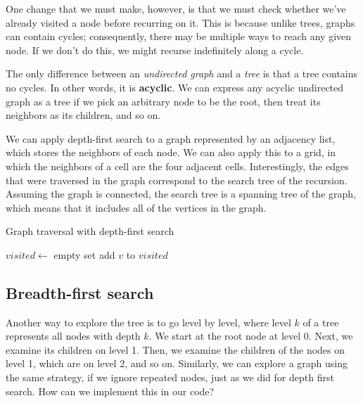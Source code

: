 One change that we must make, however, is that we must check whether we've already visited a node before recurring on it. This is because unlike trees, graphs can contain cycles; consequently, there may be multiple ways to reach any given node. If we don't do this, we might recurse indefinitely along a cycle.

The only difference between an \textit{undirected graph} and a \textit{tree} is that a tree contains no cycles. In other words, it is \textbf{acyclic}. We can express any acyclic undirected graph as a tree if we pick an arbitrary node to be the root, then treat its neighbors as its children, and so on.

We can apply depth-first search to a graph represented by an adjacency list, which stores the neighbors of each node. We can also apply this to a grid, in which the neighbors of a cell are the four adjacent cells. Interestingly, the edges that were traversed in the graph correspond to the search tree of the recursion. Assuming the graph is connected, the search tree is a spanning tree of the graph, which means that it includes all of the vertices in the graph.

\begin{algorithm}[H]
\caption{Graph traversal with depth-first search}
\begin{algorithmic}

\State $visited \gets$ empty set
    \State add $v$ to $visited$
            \State {}
        \EndIf
    \EndFor
\EndFunction

\end{algorithmic}
\end{algorithm}



\subsection{Breadth-first search}

Another way to explore the tree is to go level by level, where level $k$ of a tree represents all nodes with depth $k$. We start at the root node at level 0. Next, we examine its children on level 1. Then, we examine the children of the nodes on level 1, which are on level 2, and so on. Similarly, we can explore a graph using the same strategy, if we ignore repeated nodes, just as we did for depth first search. How can we implement this in our code?

